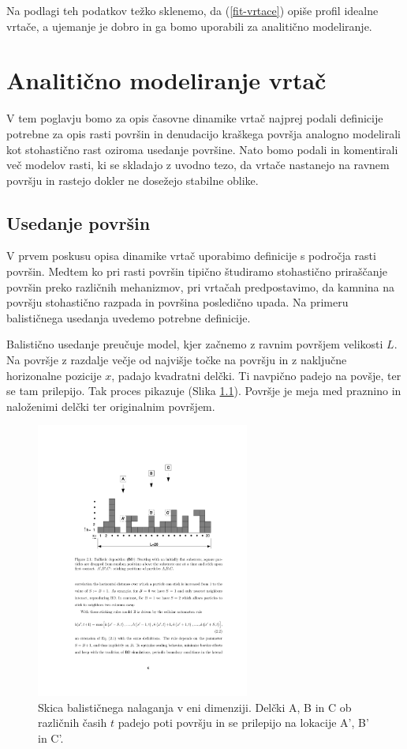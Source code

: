 \documentclass[a4paper, twoside, 12pt]{book}
\begin{document}
  Na podlagi teh podatkov težko sklenemo, da (\ref{fit-vrtace}) opiše profil idealne vrtače, a ujemanje je dobro in ga bomo uporabili za analitično modeliranje.


  \chapter{Analitično modeliranje vrtač}
  \label{analiticno-modeliranje}

V tem poglavju bomo za opis časovne dinamike vrtač najprej podali definicije potrebne za opis rasti površin in denudacijo kraškega površja analogno modelirali kot stohastično rast oziroma usedanje površine. Nato bomo podali in komentirali več modelov rasti, ki se skladajo z uvodno tezo, da vrtače nastanejo na ravnem površju in rastejo dokler ne dosežejo stabilne oblike.

  \section{Usedanje površin}
  \label{definicije}

  V prvem poskusu opisa dinamike vrtač uporabimo definicije s področja rasti površin. Medtem ko pri rasti površin tipično študiramo stohastično priraščanje površin preko različnih mehanizmov, pri vrtačah predpostavimo, da kamnina na površju stohastično razpada in površina posledično upada. Na primeru balističnega usedanja uvedemo potrebne definicije. \cite{barabasi1995fractal}

Balistično usedanje preučuje model, kjer začnemo z ravnim površjem velikosti $L$. Na površje z razdalje večje od najvišje točke na površju in z naključne horizonalne pozicije $x$, padajo kvadratni delčki. Ti navpično padejo na povšje, ter se tam prilepijo. Tak proces pikazuje (Slika \ref{fig:bdep}).
Površje je meja med praznino in naloženimi delčki ter originalnim površjem.

    \begin{figure}[h]
      \begin{center}
        \includegraphics[width=7cm]{slike/bdep}
      \end{center}
      \caption{Skica balističnega nalaganja v eni dimenziji. Delčki A, B in C ob različnih časih $t$ padejo poti površju in se prilepijo na lokacije A’, B’ in C’.}
      \label{fig:bdep}
    \end{figure}
\end{document}
